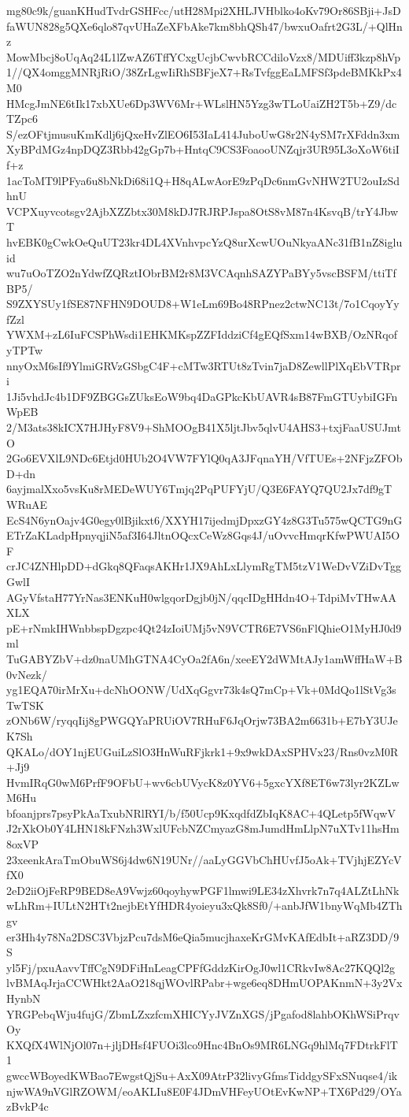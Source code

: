mg80c9k/guanKHudTvdrGSHFcc/utH28Mpi2XHLJVHblko4oKv79Or86SBji+JsD
faWUN828g5QXe6qlo87qvUHaZeXFbAke7km8bhQSh47/bwxuOafrt2G3L/+QlHnz
MowMbcj8oUqAq24L1lZwAZ6TffYCxgUcjbCwvbRCCdiloVzx8/MDUiff3kzp8hVp
1//QX4omggMNRjRiO/38ZrLgwIiRhSBFjeX7+RsTvfggEaLMFSf3pdeBMKkPx4M0
HMcgJmNE6tIk17xbXUe6Dp3WV6Mr+WLslHN5Yzg3wTLoUaiZH2T5b+Z9/dcTZpc6
S/ezOFtjmusuKmKdlj6jQxeHvZlEO6I53IaL414JuboUwG8r2N4ySM7rXFddn3xm
XyBPdMGz4npDQZ3Rbb42gGp7b+HntqC9CS3FoaooUNZqjr3UR95L3oXoW6tiIf+z
1acToMT9lPFya6u8bNkDi68i1Q+H8qALwAorE9zPqDc6nmGvNHW2TU2ouIzSdhnU
VCPXuyvcotsgv2AjbXZZbtx30M8kDJ7RJRPJspa8OtS8vM87n4KsvqB/trY4JbwT
hvEBK0gCwkOeQuUT23kr4DL4XVnhvpcYzQ8urXcwUOuNkyaANc31fB1nZ8igluid
wu7uOoTZO2nYdwfZQRztIObrBM2r8M3VCAqnhSAZYPaBYy5vscBSFM/ttiTfBP5/
S9ZXYSUy1fSE87NFHN9DOUD8+W1eLm69Bo48RPnez2ctwNC13t/7o1CqoyYyfZzl
YWXM+zL6IuFCSPhWsdi1EHKMKspZZFIddziCf4gEQfSxm14wBXB/OzNRqofyTPTw
nnyOxM6sIf9YlmiGRVzGSbgC4F+cMTw3RTUt8zTvin7jaD8ZewllPlXqEbVTRpri
1Ji5vhdJc4b1DF9ZBGGsZUksEoW9bq4DaGPkcKbUAVR4sB87FmGTUybiIGFnWpEB
2/M3ats38kICX7HJHyF8V9+ShMOOgB41X5ljtJbv5qlvU4AHS3+txjFaaUSUJmtO
2Go6EVXlL9NDc6Etjd0HUb2O4VW7FYlQ0qA3JFqnaYH/VfTUEs+2NFjzZFObD+dn
6ayjmalXxo5vsKu8rMEDeWUY6Tmjq2PqPUFYjU/Q3E6FAYQ7QU2Jx7df9gTWRuAE
EcS4N6ynOajv4G0egy0lBjikxt6/XXYH17ijedmjDpxzGY4z8G3Tu575wQCTG9nG
ETrZaKLadpHpnyqjiN5af3I64JltnOQcxCeWz8Gqs4J/uOvvcHmqrKfwPWUAI5OF
crJC4ZNHlpDD+dGkq8QFaqsAKHr1JX9AhLxLlymRgTM5tzV1WeDvVZiDvTggGwlI
AGyVfstaH77YrNas3ENKuH0wlgqorDgjb0jN/qqcIDgHHdn4O+TdpiMvTHwAAXLX
pE+rNmkIHWnbbspDgzpc4Qt24zIoiUMj5vN9VCTR6E7VS6nFlQhieO1MyHJ0d9ml
TuGABYZbV+dz0naUMhGTNA4CyOa2fA6n/xeeEY2dWMtAJy1amWffHaW+B0vNezk/
yg1EQA70irMrXu+dcNhOONW/UdXqGgvr73k4sQ7mCp+Vk+0MdQo1lStVg3sTwTSK
zONb6W/ryqqIij8gPWGQYaPRUiOV7RHuF6JqOrjw73BA2m6631b+E7bY3UJeK7Sh
QKALo/dOY1njEUGuiLzSlO3HnWuRFjkrk1+9x9wkDAxSPHVx23/Rns0vzM0R+Jj9
HvmIRqG0wM6PrfF9OFbU+wv6cbUVycK8z0YV6+5gxcYXf8ET6w73lyr2KZLwM6Hu
bfoanjprs7psyPkAaTxubNRlRYI/b/f50Ucp9KxqdfdZbIqK8AC+4QLetp5fWqwV
J2rXkOb0Y4LHN18kFNzh3WxlUFcbNZCmyazG8mJumdHmLlpN7uXTv11hsHm8oxVP
23xeenkAraTmObuWS6j4dw6N19UNr//aaLyGGVbChHUvfJ5oAk+TVjhjEZYcVfX0
2eD2iiOjFeRP9BED8eA9Vwjz60qoyhywPGF1lmwi9LE34zXhvrk7n7q4ALZtLhNk
wLhRm+IULtN2HTt2nejbEtYfHDR4yoieyu3xQk8Sf0/+anbJfW1bnyWqMb4ZThgv
er3Hh4y78Na2DSC3VbjzPcu7dsM6eQia5mucjhaxeKrGMvKAfEdbIt+aRZ3DD/9S
yl5Fj/pxuAavvTffCgN9DFiHnLeagCPFfGddzKirOgJ0wl1CRkvIw8Ac27KQQl2g
lvBMAqJrjaCCWHkt2AaO218qjWOvlRPabr+wge6eq8DHmUOPAKnmN+3y2VxHynbN
YRGPebqWju4fujG/ZbmLZxzfcmXHICYyJVZnXGS/jPgafod8lahbOKhWSiPrqvOy
KXQfX4WlNjOl07n+jljDHsf4FUOi3lco9Hnc4BnOs9MR6LNGq9hlMq7FDtrkFlT1
gwccWBoyedKWBao7EwgstQjSu+AxX09AtrP32livyGfmsTiddgySFxSNuqse4/ik
njwWA9nVGlRZOWM/eoAKLIu8E0F4JDmVHFeyUOtEvKwNP+TX6Pd29/OYazBvkP4c
